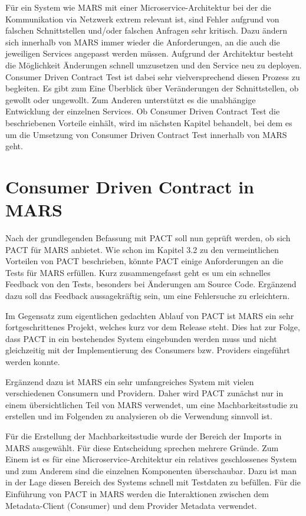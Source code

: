 \documentclass{llncs}
\begin{document}
Für ein System wie MARS mit einer Microservice-Architektur bei der die Kommunikation via Netzwerk extrem relevant ist, sind Fehler aufgrund von falschen Schnittstellen und/oder falschen Anfragen sehr kritisch. Dazu ändern sich innerhalb von MARS immer wieder die Anforderungen, an die auch die jeweiligen Services angepasst werden müssen. Aufgrund der Architektur besteht die Möglichkeit Änderungen schnell umzusetzen und den Service neu zu deployen. Consumer Driven Contract Test ist dabei sehr vielversprechend diesen Prozess zu begleiten. Es gibt zum Eine Überblick über Veränderungen der Schnittstellen, ob gewollt oder ungewollt. Zum Anderen unterstützt es die unabhängige Entwicklung der einzelnen Services. Ob Consumer Driven Contract Test die beschriebenen Vorteile einhält, wird im nächsten Kapitel behandelt, bei dem es um die Umsetzung von Consumer Driven Contract Test innerhalb von MARS geht.

\section{Consumer Driven Contract in MARS}
Nach der grundlegenden Befassung mit PACT soll nun geprüft werden, ob sich PACT für MARS anbietet. Wie schon im Kapitel 3.2 zu den vermeintlichen Vorteilen von PACT beschrieben, könnte PACT einige Anforderungen an die Tests für MARS erfüllen.
Kurz zusammengefasst geht es um ein schnelles Feedback von den Tests, besonders bei Änderungen am Source Code. Ergänzend dazu soll das Feedback aussagekräftig sein, um eine Fehlersuche zu erleichtern.

Im Gegensatz zum eigentlichen gedachten Ablauf von PACT ist MARS ein sehr fortgeschrittenes Projekt, welches kurz vor dem Release steht. Dies hat zur Folge, dass PACT in ein bestehendes System eingebunden werden muss und nicht gleichzeitig mit der Implementierung des Consumers bzw. Providers eingeführt werden konnte.

Ergänzend dazu ist MARS ein sehr umfangreiches System mit vielen verschiedenen Consumern und Providern. Daher wird PACT zunächst nur in einem übersichtlichen Teil von MARS verwendet, um eine Machbarkeitsstudie zu erstellen und im Folgenden zu analysieren ob die Verwendung sinnvoll ist.

Für die Erstellung der Machbarkeitsstudie wurde der Bereich der Imports in MARS ausgewählt. Für diese Entscheidung sprechen mehrere Gründe. Zum Einem ist es für eine Microservice-Architektur ein relatives geschlossenes System und zum Anderem sind die einzelnen Komponenten überschaubar. Dazu ist man in der Lage diesen Bereich des Systems schnell mit Testdaten zu befüllen. Für die Einführung von PACT in MARS werden die Interaktionen zwischen dem Metadata-Client (Consumer) und dem Provider Metadata verwendet.
\end{document}
